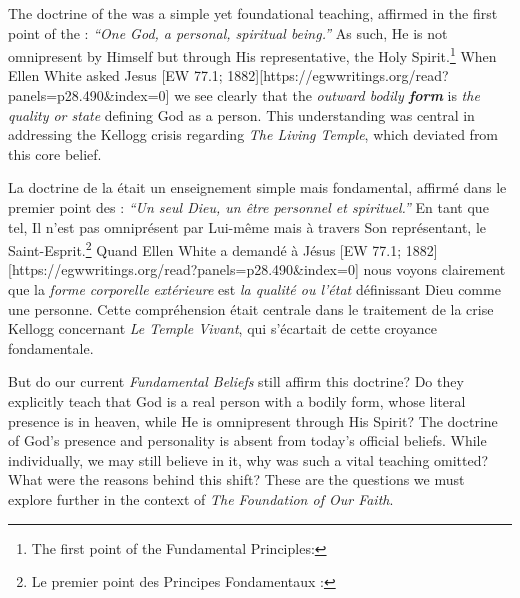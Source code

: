 The doctrine of the  was a simple yet foundational teaching, affirmed in the first point of the : \textit{“One God, a personal, spiritual being.”} As such, He is not omnipresent by Himself but through His representative, the Holy Spirit.\footnote{The first point of the Fundamental Principles: } When Ellen White asked Jesus [EW 77.1; 1882][https://egwwritings.org/read?panels=p28.490&index=0] we see clearly that the \textit{outward bodily \textbf{form}} is \textit{the quality or state} defining God as a person. This understanding was central in addressing the Kellogg crisis regarding \textit{The Living Temple}, which deviated from this core belief.


La doctrine de la  était un enseignement simple mais fondamental, affirmé dans le premier point des  : \textit{“Un seul Dieu, un être personnel et spirituel.”} En tant que tel, Il n'est pas omniprésent par Lui-même mais à travers Son représentant, le Saint-Esprit.\footnote{Le premier point des Principes Fondamentaux : } Quand Ellen White a demandé à Jésus [EW 77.1; 1882][https://egwwritings.org/read?panels=p28.490&index=0] nous voyons clairement que la \textit{forme corporelle extérieure} est \textit{la qualité ou l'état} définissant Dieu comme une personne. Cette compréhension était centrale dans le traitement de la crise Kellogg concernant \textit{Le Temple Vivant}, qui s'écartait de cette croyance fondamentale.


But do our current \textit{Fundamental Beliefs} still affirm this doctrine? Do they explicitly teach that God is a real person with a bodily form, whose literal presence is in heaven, while He is omnipresent through His Spirit? The doctrine of God’s presence and personality is absent from today’s official beliefs. While individually, we may still believe in it, why was such a vital teaching omitted? What were the reasons behind this shift? These are the questions we must explore further in the context of \textit{The Foundation of Our Faith}.


